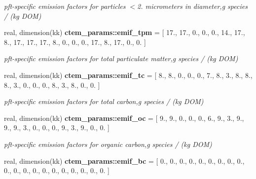 \begin{DoxyCompactItemize}
\begin{DoxyCompactList}\small\item\em pft-\/specific emission factors for particles $<$2. micrometers in diameter,g species / (kg D\+O\+M) \end{DoxyCompactList}\item 
\hypertarget{namespacectem__params_a963896fb7e7da4daecc87391c68c903e}{}real, dimension(kk) {\bfseries ctem\+\_\+params\+::emif\+\_\+tpm} = \mbox{[} 17., 17., 0., 0., 0., 14., 17., 8., 17., 17., 17., 8., 0., 0., 0., 17., 8., 17., 0., 0. \mbox{]}\label{namespacectem__params_a963896fb7e7da4daecc87391c68c903e}

\begin{DoxyCompactList}\small\item\em pft-\/specific emission factors for total particulate matter,g species / (kg D\+O\+M) \end{DoxyCompactList}\item 
\hypertarget{namespacectem__params_a3c3f54dc0014275a3c519f419392bfc9}{}real, dimension(kk) {\bfseries ctem\+\_\+params\+::emif\+\_\+tc} = \mbox{[} 8., 8., 0., 0., 0., 7., 8., 3., 8., 8., 8., 3., 0., 0., 0., 8., 3., 8., 0., 0. \mbox{]}\label{namespacectem__params_a3c3f54dc0014275a3c519f419392bfc9}

\begin{DoxyCompactList}\small\item\em pft-\/specific emission factors for total carbon,g species / (kg D\+O\+M) \end{DoxyCompactList}\item 
\hypertarget{namespacectem__params_a430c392f52f3c3c0be45b52919c33da9}{}real, dimension(kk) {\bfseries ctem\+\_\+params\+::emif\+\_\+oc} = \mbox{[} 9., 9., 0., 0., 0., 6., 9., 3., 9., 9., 9., 3., 0., 0., 0., 9., 3., 9., 0., 0. \mbox{]}\label{namespacectem__params_a430c392f52f3c3c0be45b52919c33da9}

\begin{DoxyCompactList}\small\item\em pft-\/specific emission factors for organic carbon,g species / (kg D\+O\+M) \end{DoxyCompactList}\item 
\hypertarget{namespacectem__params_a4cee3e6d838d5971990e283211e601e6}{}real, dimension(kk) {\bfseries ctem\+\_\+params\+::emif\+\_\+bc} = \mbox{[} 0., 0., 0., 0., 0., 0., 0., 0., 0., 0., 0., 0., 0., 0., 0., 0., 0., 0., 0., 0. \mbox{]}\label{namespacectem__params_a4cee3e6d838d5971990e283211e601e6}


\end{DoxyCompactItemize}

